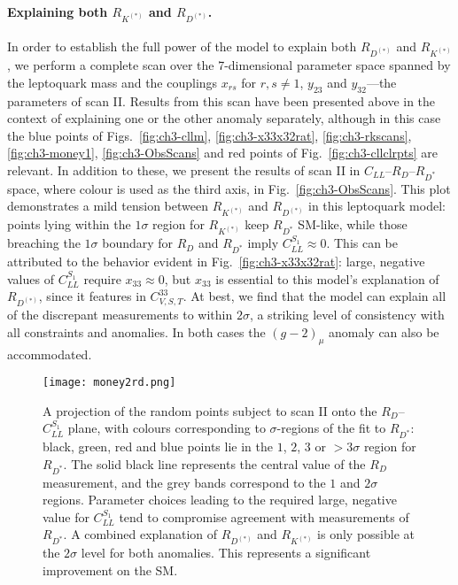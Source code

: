 \paragraph{Explaining both $R_{K^{(*)}}$ and $R_{D^{(*)}}$.} In order to
establish the full power of the model to explain both $R_{D^{(*)}}$ and
$R_{K^{(*)}}$, we perform a complete scan over the 7-dimensional parameter space
spanned by the leptoquark mass and the couplings $x_{rs}$ for $r,s \neq 1$,
$y_{23}$ and $y_{32}$---the parameters of scan II. Results from this scan have
been presented above in the context of explaining one or the other anomaly
separately, although in this case the blue points of Figs.~\ref{fig:ch3-cllm},
\ref{fig:ch3-x33x32rat}, \ref{fig:ch3-rkscans}, \ref{fig:ch3-money1}, \ref{fig:ch3-ObsScans} and
red points of Fig.~\ref{fig:ch3-cllclrpts} are relevant. In addition to these, we
present the results of scan II in $C_{LL}$--$R_D$--$R_{D^*}$ space, where colour
is used as the third axis, in Fig.~\ref{fig:ch3-ObsScans}. This plot demonstrates a
mild tension between $R_{K^{(*)}}$ and $R_{D^{(*)}}$ in this leptoquark model:
points lying within the $1\sigma$ region for $R_{K^{(*)}}$ keep $R_{ D^* }$
SM-like, while those breaching the $1\sigma$ boundary for $R_D$ and $R_{D^*}$
imply $C^{S_{1}}_{LL} \approx 0$. This can be attributed to the behavior evident in
Fig.~\ref{fig:ch3-x33x32rat}: large, negative values of $C_{LL}^{S_{1}}$ require
$x_{33} \approx 0$, but $x_{33}$ is essential to this model's explanation of
$R_{D^{(*)}}$, since it features in $C^{33}_{V,S,T}$. At best, we find that the
model can explain all of the discrepant measurements to within $2\sigma$, a
striking level of consistency with all constraints and anomalies. In both cases
the $(g-2)_\mu$ anomaly can also be accommodated.

\begin{figure}[t]
    \centering \texttt{[image: money2rd.png]}
    \caption[A projection of the random points subject to scan II onto the
      $R_D$--$C_{LL}^{S_{1}}$ plane, with colours corresponding to $\sigma$-regions
      of the fit to $R_{D^*}$: black, green, red and blue points lie in the $1$,
      $2$, $3$ or $>3\sigma$ region for $R_{D^*}$.]{A projection of the random points subject to scan II onto the
      $R_D$--$C_{LL}^{S_{1}}$ plane, with colours corresponding to $\sigma$-regions
      of the fit to $R_{D^*}$: black, green, red and blue points lie in the $1$,
      $2$, $3$ or $>3\sigma$ region for $R_{D^*}$. The solid black line
      represents the central value of the $R_D$ measurement, and the grey bands
      correspond to the $1$ and $2\sigma$ regions. Parameter choices leading to
      the required large, negative value for $C_{LL}^{S_{1}}$ tend to compromise
      agreement with measurements of $R_{D^*}$. A combined explanation of
      $R_{D^{(*)}}$ and $R_{K^{(*)}}$ is only possible at the $2\sigma$ level
      for both anomalies. This represents a significant improvement on the SM.}
  \label{fig:ch3-money}
\end{figure}
